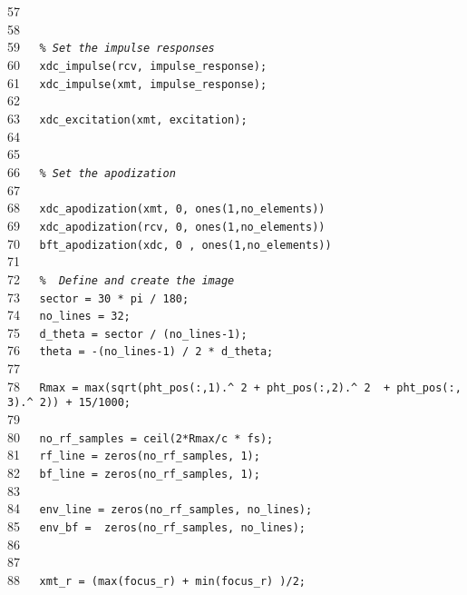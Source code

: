 \documentclass{manual}
\begin{document}
{57{\tt~~~}{\tt }\\
58{\tt~~~}{\tt }\\
59{\tt~~~}{\tt {\sl \%~Set~the~impulse~responses}}\\
60{\tt~~~}{\tt xdc\_impulse(rcv,~impulse\_response);}\\
61{\tt~~~}{\tt xdc\_impulse(xmt,~impulse\_response);}\\
62{\tt~~~}{\tt }\\
63{\tt~~~}{\tt xdc\_excitation(xmt,~excitation);}\\
64{\tt~~~}{\tt }\\
65{\tt~~~}{\tt }\\
66{\tt~~~}{\tt {\sl \%~Set~the~apodization}}\\
67{\tt~~~}{\tt }\\
68{\tt~~~}{\tt xdc\_apodization(xmt,~0,~ones(1,no\_elements))}\\
69{\tt~~~}{\tt xdc\_apodization(rcv,~0,~ones(1,no\_elements))}\\
70{\tt~~~}{\tt bft\_apodization(xdc,~0~,~ones(1,no\_elements))}\\
71{\tt~~~}{\tt }\\
72{\tt~~~}{\tt {\sl \%~~Define~and~create~the~image}}\\
73{\tt~~~}{\tt sector~=~30~*~pi~/~180;}\\
74{\tt~~~}{\tt no\_lines~=~32;}\\
75{\tt~~~}{\tt d\_theta~=~sector~/~(no\_lines-1);}\\
76{\tt~~~}{\tt theta~=~-(no\_lines-1)~/~2~*~d\_theta;}\\
77{\tt~~~}{\tt }\\
78{\tt~~~}{\tt Rmax~=~max(sqrt(pht\_pos(:,1).\^~2~+~pht\_pos(:,2).\^~2~~+~pht\_pos(:,3).\^~2))~+~15/1000;}\\
79{\tt~~~}{\tt }\\
80{\tt~~~}{\tt no\_rf\_samples~=~ceil(2*Rmax/c~*~fs);}\\
81{\tt~~~}{\tt rf\_line~=~zeros(no\_rf\_samples,~1);}\\
82{\tt~~~}{\tt bf\_line~=~zeros(no\_rf\_samples,~1);}\\
83{\tt~~~}{\tt }\\
84{\tt~~~}{\tt env\_line~=~zeros(no\_rf\_samples,~no\_lines);}\\
85{\tt~~~}{\tt env\_bf~=~~zeros(no\_rf\_samples,~no\_lines);}\\
86{\tt~~~}{\tt }\\
87{\tt~~~}{\tt }\\
88{\tt~~~}{\tt xmt\_r~=~(max(focus\_r)~+~min(focus\_r)~)/2;}\\
}
\end{document}
